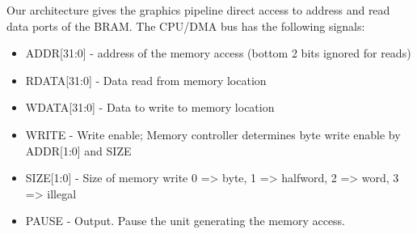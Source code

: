 \documentclass[11pt,a4paper]{article}
\begin{document}
	Our architecture gives the graphics pipeline direct access to address and read data ports of the BRAM. The CPU/DMA bus has the following signals:
		\begin{itemize}
			\item ADDR[31:0]  - address of the memory access (bottom 2 bits ignored for reads)
			\item RDATA[31:0] - Data read from memory location
			\item WDATA[31:0] - Data to write to memory location
			\item WRITE       - Write enable; Memory controller determines byte write enable by ADDR[1:0] and SIZE
			\item SIZE[1:0]   - Size of memory write {0 => byte, 1 => halfword, 2 => word, 3 => illegal}
			\item PAUSE       - Output. Pause the unit generating the memory access.
		\end{itemize} 

	
\end{document}
